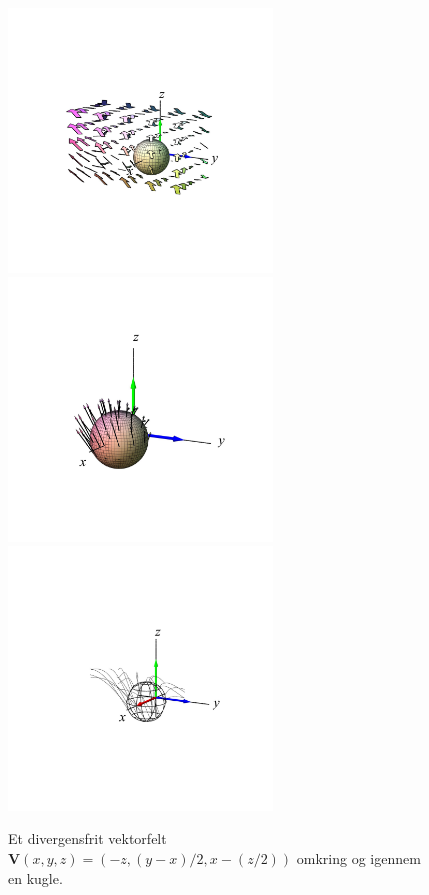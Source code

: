 \begin{figure}[ht]
\centerline{\includegraphics[width=70mm]{FIGS/plotSphFlowRot1}\includegraphics[width=70mm]{FIGS/plotSphFlowRot2} \includegraphics[width=70mm]{FIGS/plotSphFlowRot3}}
\begin{center}
\caption{\small{Et divergensfrit vektorfelt $\mathbf{V}(x,y,z) = (-z, (y-x)/2, x-(z/2))$ omkring og igennem en kugle.}} \label{figSphFlowRotA}
\end{center}
\end{figure}


